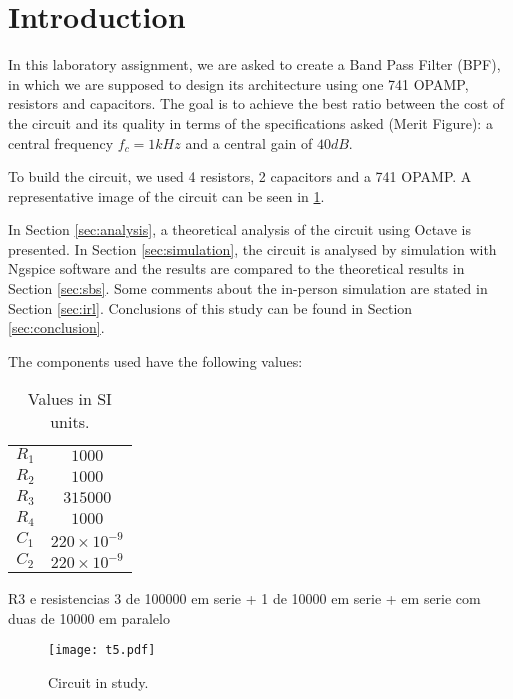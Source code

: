 \section{Introduction}
\label{sec:introduction}

In this laboratory assignment, we are asked to create a Band Pass Filter (BPF), in which we are supposed to design its architecture using one 741 OPAMP, resistors and capacitors. The goal is to achieve the best ratio between the cost of the circuit and its quality in terms of the specifications asked (Merit Figure): a central frequency $f_c=1 kHz$ and a central gain of $40 dB$. \par
To build the circuit, we used 4 resistors, 2 capacitors and a 741 OPAMP. A representative image of the circuit can be seen in \ref{fig:t5}. \par


In Section \ref{sec:analysis}, a theoretical analysis of the circuit using Octave is presented. In Section \ref{sec:simulation}, the circuit is analysed by simulation with Ngspice software and the results are compared to the theoretical results in Section \ref{sec:sbs}. Some comments about the in-person simulation are stated in Section \ref{sec:irl}. Conclusions of this study can be found in Section \ref{sec:conclusion}.

The components used have the following values:
\begin{table}[h]
\centering
\begin{small}
\caption{Values in SI units.}
\begin{tabular}{|c|c|}
\hline
$R_1$ & $1000$ \\
$R_2$ & $1000$\\
$R_3$ & $315000$ \\
$R_4$ & $1000$ \\
$C_1$ & $220\times 10^{-9}$ \\
$C_2$ & $220\times 10^{-9}$ \\
\hline
\end{tabular}
\end{small}
\end{table}

R3 e resistencias 3 de 100000 em serie + 1 de 10000 em serie + em serie com duas de 10000 em paralelo


\begin{figure}[htp] \centering
\texttt{[image: t5.pdf]}
\caption{Circuit in study.}
\label{fig:t5}
\end{figure}
\FloatBarrier


